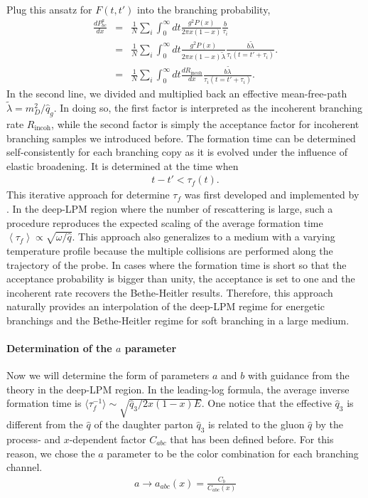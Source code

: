 Plug this ansatz for $F(t, t')$ into the branching probability,
\begin{eqnarray}
\frac{dP^{a}_{bc}}{dx} &=& \frac{1}{N}\sum_i \int_0^\infty dt \frac{g^2 P(x)}{2\pi x (1-x)} \frac{b}{\tau_i} \\  
 &=& \frac{1}{N}\sum_i \int_0^\infty dt \frac{g^2 P(x)}{2\pi x (1-x) \tilde{\lambda}} \frac{b \tilde{\lambda}}{\tau_i(t=t'+\tau_i)}.\\
  &=& \frac{1}{N}\sum_i \int_0^\infty dt \frac{dR_{\textrm{incoh}}}{dx} \frac{b \tilde{\lambda}}{\tau_i(t=t'+\tau_i)}.
\end{eqnarray}
In the second line, we divided and multiplied back an effective mean-free-path $\tilde{\lambda} = m_D^2/\hat{q}_g$.
In doing so, the first factor is interpreted as the incoherent branching rate $R_{\textrm{incoh}}$, while the second factor is simply the acceptance factor for incoherent branching samples we introduced before.
The formation time can be determined self-consistently for each branching copy as it is evolved under the influence of elastic broadening.
It is determined at the time when
\begin{eqnarray}
t - t' < \tau_f(t). 
\end{eqnarray}
This iterative approach for determine $\tau_f$ was first developed and implemented by \cite{Zapp:2011ya}.
In the deep-LPM region where the number of rescattering is large, such a procedure reproduces the expected scaling of the average formation time $\left\langle\tau_f\right\rangle \propto \sqrt{\omega/\hat{q}}$.
This approach also generalizes to a medium with a varying temperature profile because the multiple collisions are performed along the trajectory of the probe.
In cases where the formation time is short so that the acceptance probability is bigger than unity, the acceptance is set to one and the incoherent rate recovers the Bethe-Heitler results.
Therefore, this approach naturally provides an interpolation of the deep-LPM regime for energetic branchings and the Bethe-Heitler regime for soft branching in a large medium.

\paragraph{Determination of the $a$ parameter} Now we will determine the form of parameters $a$ and $b$ with guidance from the theory in the deep-LPM region.
In the leading-log formula, the average inverse formation time is $\langle\tau_f^{-1}\rangle \sim \sqrt{\hat{q}_3 / 2x(1-x)E}$. 
One notice that the effective $\hat{q}_3$ is different from the $\hat{q}$ of the daughter parton 
$\hat{q}_3$ is related to the gluon $\hat{q}$ by the process- and $x$-dependent factor $C_{abc}$ that has been defined before.
For this reason, we chose the $a$ parameter to be the color combination for each branching channel.
\begin{eqnarray}
a \rightarrow a_{abc}(x) = \frac{C_b}{C_{abc}(x)}
\end{eqnarray}

